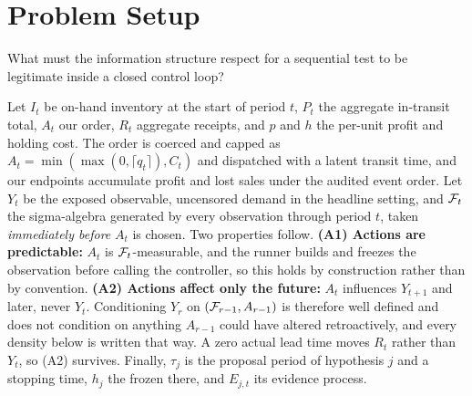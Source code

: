 \section{Problem Setup}
\label{sec:setup}

What must the information structure respect for a sequential test to be
legitimate inside a closed control loop?

Let $I_t$ be on-hand inventory at the start of period $t$, $P_t$ the aggregate
in-transit total, $A_t$ our order, $R_t$ aggregate receipts, and $p$ and $h$ the
per-unit profit and holding cost. The order is coerced and capped as
$A_t = \min(\max(0, \lceil q_t \rceil), C_t)$ and dispatched with a latent
transit time, and our endpoints accumulate profit and lost sales under the audited
event order. Let $Y_t$ be the exposed observable,
uncensored demand in the headline setting, and $\mathcal{F}_t$ the sigma-algebra
generated by every observation through period $t$, taken \emph{immediately
before} $A_t$ is chosen. Two properties follow. \textbf{(A1) Actions are
predictable:} $A_t$ is $\mathcal{F}_t$-measurable, and the runner builds and freezes
the observation before calling the controller, so this holds by construction
rather than by convention. \textbf{(A2) Actions affect only the future:} $A_t$
influences $Y_{t+1}$ and later, never $Y_t$. Conditioning $Y_r$ on
$(\mathcal{F}_{r-1}, A_{r-1})$ is therefore well defined and does not condition on
anything $A_{r-1}$ could have altered retroactively, and every density below is
written that way. A zero actual lead time moves $R_t$ rather than $Y_t$, so (A2)
survives. Finally, $\tau_j$ is the proposal period of hypothesis $j$ and a
stopping time, $h_j$ the \shockspec{} frozen there, and $E_{j,t}$ its evidence
process.
